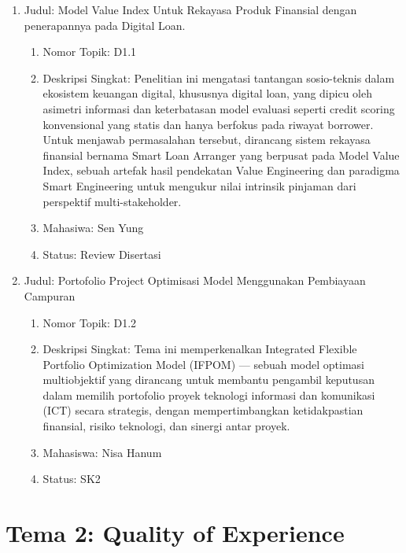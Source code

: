 \documentclass[
  letterpaper,
  DIV=11,
  numbers=noendperiod]{scrreprt}
\begin{document}
\begin{enumerate}
\def\labelenumi{\arabic{enumi}.}
\item
  Judul: Model Value Index Untuk Rekayasa Produk Finansial dengan
  penerapannya pada Digital Loan.

  \begin{enumerate}
  \def\labelenumii{\arabic{enumii}.}
  \item
    Nomor Topik: D1.1
  \item
    Deskripsi Singkat: Penelitian ini mengatasi tantangan sosio-teknis
    dalam ekosistem keuangan digital, khususnya digital loan, yang
    dipicu oleh asimetri informasi dan keterbatasan model evaluasi
    seperti credit scoring konvensional yang statis dan hanya berfokus
    pada riwayat borrower. Untuk menjawab permasalahan tersebut,
    dirancang sistem rekayasa finansial bernama Smart Loan Arranger yang
    berpusat pada Model Value Index, sebuah artefak hasil pendekatan
    Value Engineering dan paradigma Smart Engineering untuk mengukur
    nilai intrinsik pinjaman dari perspektif multi-stakeholder.
  \item
    Mahasiwa: Sen Yung
  \item
    Status: Review Disertasi
  \end{enumerate}
\item
  Judul: Portofolio Project Optimisasi Model Menggunakan Pembiayaan
  Campuran

  \begin{enumerate}
  \def\labelenumii{\arabic{enumii}.}
  \item
    Nomor Topik: D1.2
  \item
    Deskripsi Singkat: Tema ini memperkenalkan Integrated Flexible
    Portfolio Optimization Model (IFPOM) --- sebuah model optimasi
    multiobjektif yang dirancang untuk membantu pengambil keputusan
    dalam memilih portofolio proyek teknologi informasi dan komunikasi
    (ICT) secara strategis, dengan mempertimbangkan ketidakpastian
    finansial, risiko teknologi, dan sinergi antar proyek.
  \item
    Mahasiswa: Nisa Hanum
  \item
    Status: SK2
  \end{enumerate}
\end{enumerate}

\section{Tema 2: Quality of
Experience}\label{tema-2-quality-of-experience}
\end{document}
